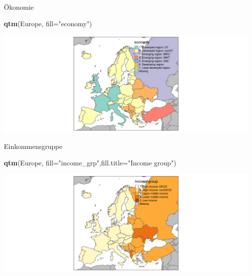 \documentclass[ignorenonframetext,]{beamer}
\newenvironment{Shaded}{\begin{snugshade}}{\end{snugshade}}
\newcommand{\KeywordTok}[1]{\textcolor[rgb]{0.13,0.29,0.53}{\textbf{#1}}}
\newcommand{\DataTypeTok}[1]{\textcolor[rgb]{0.13,0.29,0.53}{#1}}
\newcommand{\StringTok}[1]{\textcolor[rgb]{0.31,0.60,0.02}{#1}}
\newcommand{\NormalTok}[1]{#1}
\begin{document}
\begin{frame}[fragile]{Ökonomie}

\begin{Shaded}
\begin{Highlighting}[]
\KeywordTok{qtm}\NormalTok{(Europe, }\DataTypeTok{fill=}\StringTok{"economy"}\NormalTok{) }
\end{Highlighting}
\end{Shaded}

\includegraphics{slides_all2gether_part1_files/figure-beamer/unnamed-chunk-61-1.pdf}

\end{frame}

\begin{frame}[fragile]{Einkommensgruppe}

\begin{Shaded}
\begin{Highlighting}[]
\KeywordTok{qtm}\NormalTok{(Europe, }\DataTypeTok{fill=}\StringTok{"income_grp"}\NormalTok{,}\DataTypeTok{fill.title=}\StringTok{"Income group"}\NormalTok{) }
\end{Highlighting}
\end{Shaded}

\includegraphics{slides_all2gether_part1_files/figure-beamer/unnamed-chunk-62-1.pdf}

\end{frame}
\end{document}
